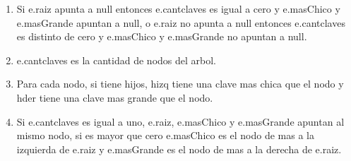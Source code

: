 \begin{enumerate}
	\item Si e.raiz apunta a null entonces e.cantclaves es igual a cero y e.masChico y e.masGrande apuntan a null, o e.raiz no apunta a null entonces e.cantclaves es distinto de cero y e.masChico y e.masGrande no apuntan a null.
	\item e.cantclaves es la cantidad de nodos del arbol.
	\item Para cada nodo, si tiene hijos, hizq tiene una clave mas chica que el nodo y hder tiene una clave mas grande que el nodo.
	\item Si e.cantclaves es igual a uno, e.raiz, e.masChico y e.masGrande apuntan al mismo nodo, si es mayor que cero e.masChico es el nodo de mas a la izquierda de e.raiz y e.masGrande es el nodo de mas a la derecha de e.raiz.

\end{enumerate}


\mbox{}

~



~

